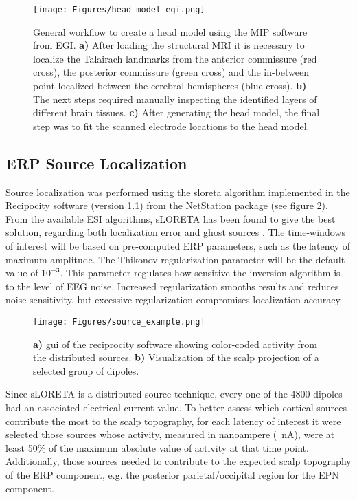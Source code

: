 \begin{figure}[H]
	\centering
	\texttt{[image: Figures/head\_model\_egi.png]}
	\caption{General workflow to create a head model using the MIP software from EGI. \textbf{a)} After loading the structural MRI it is necessary to localize the Talairach landmarks from the anterior commissure (red cross), the posterior commissure (green cross) and the in-between point localized between the cerebral hemispheres (blue cross). \textbf{b)} The next steps required manually inspecting the identified layers of different brain tissues. \textbf{c)} After generating the head model, the final step was to fit the scanned electrode locations to the head model. \label{fig:hm_egi}}
\end{figure}


\subsection{ERP Source Localization}
\label{section:erp_lcaolization}

Source localization was performed using the \acrfull{sloreta} algorithm implemented in the Recipocity software (version 1.1) from the NetStation package (see figure \ref{fig:source_example}). From the available ESI algorithms, sLORETA has been found to give the best solution, regarding both localization error and ghost sources \cite{pascual-marquiStandardizedLowresolutionBrain2002, grechReviewSolvingInverse2008}. The time-windows of interest will be based on pre-computed ERP parameters, such as the latency of maximum amplitude. The Thikonov regularization parameter will be the default value of $10^{-3}$. This parameter regulates how sensitive the inversion algorithm is to the level of EEG noise. Increased regularization smooths results and reduces noise sensitivity, but excessive regularization compromises localization accuracy \cite{michelEEGSourceImaging2019}.

\begin{figure}[H]
	\centering
	\texttt{[image: Figures/source\_example.png]}
	\caption{\textbf{a)} \acrfull{gui} of the reciprocity software showing color-coded activity from the distributed sources. \textbf{b)} Visualization of the scalp projection of a selected group of dipoles. \label{fig:source_example}}
\end{figure}

Since sLORETA is a distributed source technique, every one of the 4800 dipoles had an associated electrical current value. To better assess which cortical sources contribute the most to the scalp topography, for each latency of interest it were selected those sources whose activity, measured in nanoampere (\SI{}{nA}), were at least 50\% of the maximum absolute value of activity at that time point. Additionally, those sources needed to contribute to the expected scalp topography of the ERP component, e.g. the posterior parietal/occipital region for the EPN component.

